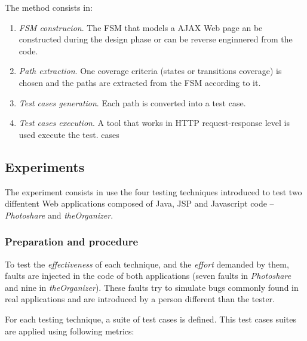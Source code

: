 \documentclass[a4paper]{article}
\begin{document}
The method consists in: 

\begin{enumerate}
\item \emph{FSM construcion}. The FSM that models a AJAX Web page an be constructed during the design phase or can be reverse enginnered from the code.
\item \emph{Path extraction}. One coverage criteria (states or transitions coverage) is chosen and the paths are extracted from the FSM according to it.
\item \emph{Test cases generation}. Each path is converted into a test case.
\item \emph{Test cases execution}. A tool that works in HTTP request-response level is used execute the test. cases
\end{enumerate}

\subsection{Experiments}

The experiment consists in use the four testing techniques introduced to test two diffentent Web applications composed of Java, JSP and Javascript code -- \emph{Photoshare} and \emph{theOrganizer}.

\subsubsection{Preparation and procedure}

To test the \emph{effectiveness} of each technique, and the \emph{effort} demanded by them, faults are injected in the code of both applications (seven faults in \emph{Photoshare} and nine in \emph{theOrganizer}).
These faults try to simulate bugs commonly found in real applications and are introduced by a person different than the tester.

For each testing technique, a suite of test cases is defined.
This test cases suites are applied using following metrics:
\end{document}
